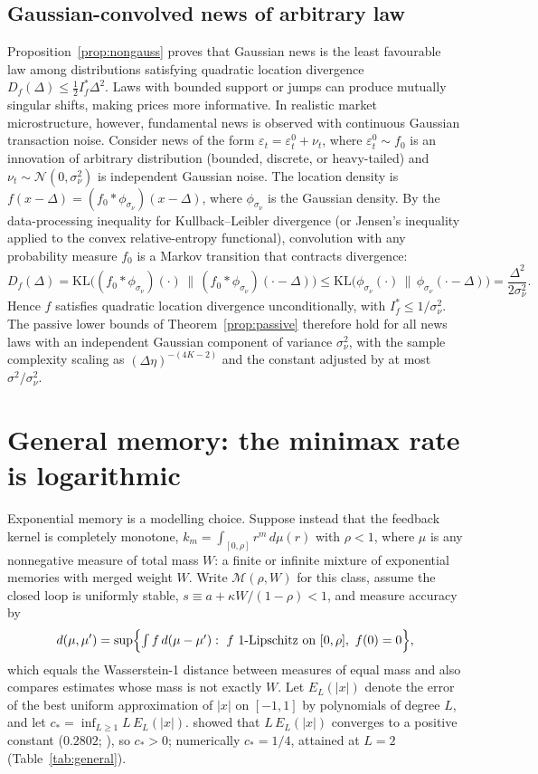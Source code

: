 \documentclass[12pt]{article}
\theoremstyle{definition}
\theoremstyle{remark}
\begin{document}
\subsection{Gaussian-convolved news of arbitrary law}\label{app:convolvednews}\label{app:convexdealer}

Proposition~\ref{prop:nongauss} proves that Gaussian news is the least favourable law among distributions satisfying quadratic location divergence $D_f(\Delta)\le\frac12I^*_f\Delta^2$. Laws with bounded support or jumps can produce mutually singular shifts, making prices more informative. In realistic market microstructure, however, fundamental news is observed with continuous Gaussian transaction noise. Consider news of the form $\varepsilon_t=\varepsilon^0_t+\nu_t$, where $\varepsilon^0_t\sim f_0$ is an innovation of arbitrary distribution (bounded, discrete, or heavy-tailed) and $\nu_t\sim\mathcal N(0,\sigma_\nu^2)$ is independent Gaussian noise. The location density is $f(x-\Delta)=(f_0*\phi_{\sigma_\nu})(x-\Delta)$, where $\phi_{\sigma_\nu}$ is the Gaussian density. By the data-processing inequality for Kullback--Leibler divergence (or Jensen's inequality applied to the convex relative-entropy functional), convolution with any probability measure $f_0$ is a Markov transition that contracts divergence:
\[
D_f(\Delta) = \mathrm{KL}\bigl((f_0*\phi_{\sigma_\nu})(\cdot)\,\big\|\,(f_0*\phi_{\sigma_\nu})(\cdot-\Delta)\bigr) \le \mathrm{KL}\bigl(\phi_{\sigma_\nu}(\cdot)\,\big\|\,\phi_{\sigma_\nu}(\cdot-\Delta)\bigr) = \frac{\Delta^2}{2\sigma_\nu^2}.
\]
Hence $f$ satisfies quadratic location divergence unconditionally, with $I^*_f\le1/\sigma_\nu^2$. The passive lower bounds of Theorem~\ref{prop:passive} therefore hold for all news laws with an independent Gaussian component of variance $\sigma_\nu^2$, with the sample complexity scaling as $(\Delta\eta)^{-(4K-2)}$ and the constant adjusted by at most $\sigma^2/\sigma_\nu^2$.

\section{General memory: the minimax rate is logarithmic}\label{sec:general}

Exponential memory is a modelling choice. Suppose instead that the feedback kernel is completely monotone, $k_m=\int_{[0,\rho]}r^m\,d\mu(r)$ with $\rho<1$, where $\mu$ is any nonnegative measure of total mass $W$: a finite or infinite mixture of exponential memories with merged weight $W$. Write $\mathcal M(\rho,W)$ for this class, assume the closed loop is uniformly stable, $s\equiv a+\kappa W/(1-\rho)<1$, and measure accuracy by
\[
d(\mu,\mu')=\sup\Bigl\{\textstyle\int f\,d(\mu-\mu'):\ f\ \text{1-Lipschitz on }[0,\rho],\ f(0)=0\Bigr\},
\]
which equals the Wasserstein-1 distance between measures of equal mass and also compares estimates whose mass is not exactly $W$. Let $E_L(|x|)$ denote the error of the best uniform approximation of $|x|$ on $[-1,1]$ by polynomials of degree $L$, and let $c_*=\inf_{L\ge1}L\,E_L(|x|)$. \citet{bernstein1914} showed that $L\,E_L(|x|)$ converges to a positive constant ($0.2802$; \citealp{varga1985}), so $c_*>0$; numerically $c_*=1/4$, attained at $L=2$ (Table~\ref{tab:general}).
\end{document}
